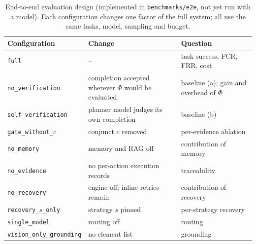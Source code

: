 \begin{table}[t]
\centering
\caption{End-to-end evaluation design (implemented in \texttt{benchmarks/e2e}, not yet run with a model). Each configuration changes one factor of the full system; all use the same tasks, model, sampling and budget.}
\label{tab:e2e}
\footnotesize
\setlength{\tabcolsep}{2.2pt}
\begin{tabular}{@{}p{2.95cm}p{2.85cm}p{2.6cm}@{}}
\toprule
Configuration & Change & Question \\
\midrule
\texttt{full} & -- & task success, FCR, FRR, cost \\
\texttt{no\_verification} & completion accepted wherever $\Phi$ would be evaluated & baseline (a); gain and overhead of $\Phi$ \\
\texttt{self\_verification} & planner model judges its own completion & baseline (b) \\
\texttt{gate\_without\_}$c$ & conjunct $c$ removed & per-evidence ablation \\
\texttt{no\_memory} & memory and RAG off & contribution of memory \\
\texttt{no\_evidence} & no per-action execution records & traceability \\
\texttt{no\_recovery} & engine off; inline retries remain & contribution of recovery \\
\texttt{recovery\_}$s$\texttt{\_only} & strategy $s$ pinned & per-strategy recovery \\
\texttt{single\_model} & routing off & routing \\
\texttt{vision\_only\_\allowbreak grounding} & no element list & grounding \\
\bottomrule
\end{tabular}
\end{table}
